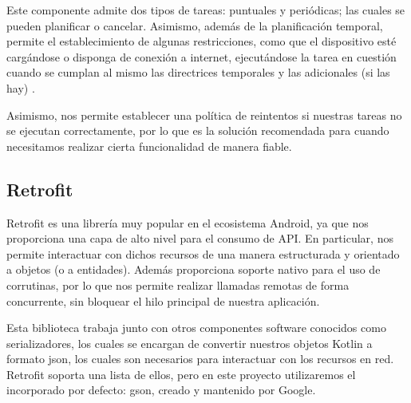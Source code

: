             Este componente admite dos tipos de tareas: puntuales y periódicas; las cuales se pueden planificar o 
            cancelar. Asimismo, además de la planificación temporal, permite el establecimiento de algunas restricciones,
            como que el dispositivo esté cargándose o disponga de conexión a internet, ejecutándose la tarea en cuestión
            cuando se cumplan al mismo las directrices temporales y las adicionales (si las hay) 
            \cite{noauthor_arquitectura_nodate}.

            Asimismo, nos permite establecer una política de reintentos si nuestras tareas no se ejecutan correctamente,
            por lo que es la solución recomendada para cuando necesitamos realizar cierta funcionalidad de manera fiable.
            

        \subsection{Retrofit}
            Retrofit es una librería muy popular en el ecosistema Android, ya que nos proporciona una capa de alto nivel
            para el consumo de API. En particular, nos permite interactuar con dichos recursos de una manera estructurada
            y orientado a objetos (o a entidades). Además proporciona soporte nativo para el uso de corrutinas, por lo
            que nos permite realizar llamadas remotas de forma concurrente, sin bloquear el hilo principal de nuestra
            aplicación.

            Esta biblioteca trabaja junto con otros componentes software conocidos como serializadores, los cuales se 
            encargan de convertir nuestros objetos Kotlin a formato json, los cuales son necesarios para interactuar
            con los recursos en red. Retrofit soporta una lista de ellos, pero en este proyecto utilizaremos el 
            incorporado por defecto: gson, creado y mantenido por Google.

